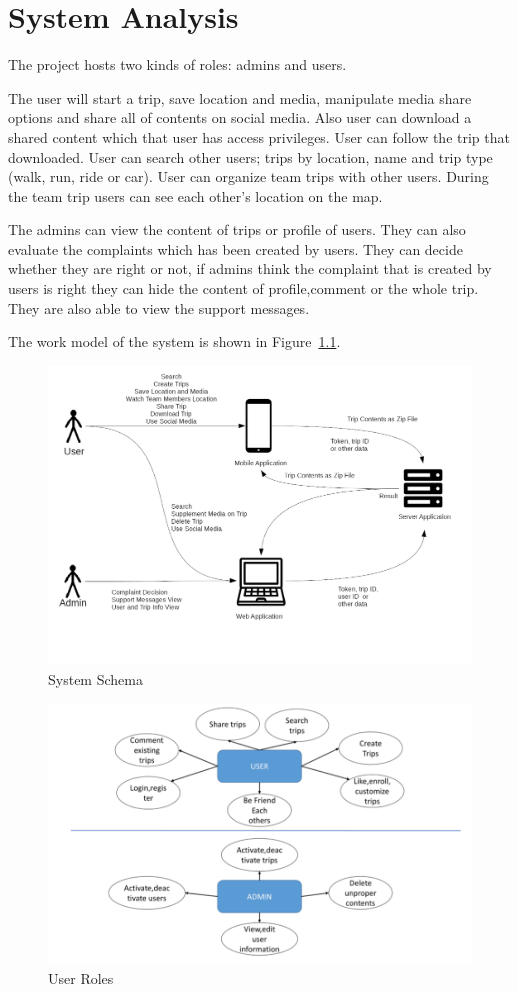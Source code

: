 \chapter{System Analysis}

The project hosts two kinds of roles: admins and users. 

The user will start a trip, save location and media, manipulate media share options and share all of contents on social media. Also user can download a shared content which that user has access privileges. User can follow the trip that downloaded. User can search other users; trips by location, name and trip type (walk, run, ride or car). User can organize team trips with other users. During the team trip users can see each other's location on the map.

The admins can view the content of trips or profile of users. They can also evaluate the complaints which has been created by users. They can decide whether they are right or not, if admins think the complaint that is created by users is right they can hide the content of profile,comment or the whole trip. They are also able to view the support messages. 

The work model of the system is shown in Figure~\ref{fig:system_diagram}.

\begin{figure}[!htbp]
\centering
\includegraphics[width=\textwidth]{projectChapters/images/system_diagram.png}
\caption{System Schema}
\label{fig:system_diagram}
\end{figure}

\begin{figure}[!htbp]
\centering
\includegraphics[width=\textwidth]{projectChapters/images/ER.png}
\caption{User Roles}
\label{fig:roles}
\end{figure}